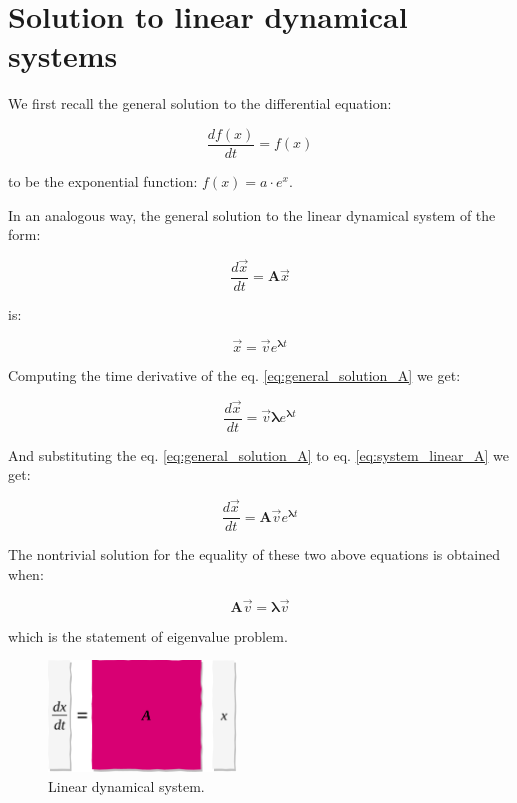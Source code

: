 \documentclass[10pt,twocolumn]{article}
\begin{document}
\appendix

\section{Solution to linear dynamical systems} \label{app:A}

We first recall the general solution to the differential equation:

\begin{equation} \label{eq:DE_exp}
\frac{d f(x)}{dt} = f(x)
\end{equation}

to be the exponential function: $f(x) = a \cdot e^{x}$.


In an analogous way, the general solution to the linear dynamical system of the form:

\begin{equation} \label{eq:system_linear_A}
\frac{d \vec{x}}{dt} = \bm{A} \vec{x}
\end{equation}

is:

\begin{equation} \label{eq:general_solution_A}
\vec{x} = \vec{v} e^{\bm{\lambda} t}
\end{equation}

Computing the time derivative of the eq. \ref{eq:general_solution_A} we get:

\begin{equation} \label{eq:sub1}
\frac{d \vec{x}}{dt} = \vec{v} \bm{\lambda} e^{\bm{\lambda} t}
\end{equation}

And substituting the eq. \ref{eq:general_solution_A} to eq. \ref{eq:system_linear_A} we get:

\begin{equation} \label{eq:sub2}
\frac{d \vec{x}}{dt} = \bm{A} \vec{v} e^{\bm{\lambda} t}
\end{equation}

The nontrivial solution for the equality of these two above equations is obtained when:

\begin{equation} \label{eq:eigval}
\bm{A} \vec{v} = \bm{\lambda} \vec{v} 
\end{equation}

which is the statement of eigenvalue problem.



\begin{figure}[H]
\centering\includegraphics[width=5cm]{lin-dyn.png}
\caption{Linear dynamical system.}
\label{fig:linear_system}
\end{figure}
\end{document}
